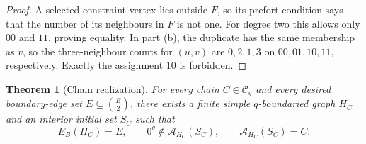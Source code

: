 \documentclass[11pt,reqno]{amsart}
\newtheorem{theorem}{Theorem}[section]
\theoremstyle{definition}
\begin{document}
\begin{proof}
A selected constraint vertex lies outside $F$, so its prefort condition says
that the number of its neighbours in $F$ is not one.  For degree two this
allows only $00$ and $11$, proving equality.  In part (b), the duplicate has
the same membership as $v$, so the three-neighbour counts for $(u,v)$ are
$0,2,1,3$ on $00,01,10,11$, respectively.  Exactly the assignment $10$ is
forbidden.
\end{proof}

\begin{theorem}[Chain realization]\label{thm:chain-realization}
For every chain $C\in\mathcal C_q$ and every desired boundary-edge set
$E\subseteq\binom B2$, there exists a finite simple $q$-boundaried graph $H_C$
and an interior initial set $S_C$ such that
\[
 E_B(H_C)=E,
 \qquad
 0^q\notin\mathcal A_{H_C}(S_C),
 \qquad
 \mathcal A_{H_C}(S_C)=C.
\]
\end{theorem}
\end{document}
